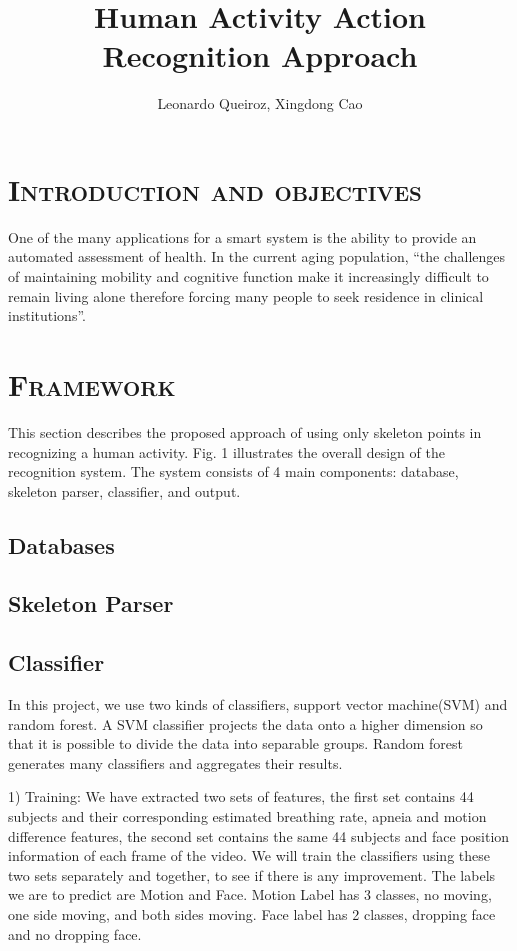 \documentclass{article}
\begin{document}
	\title{Human Activity Action Recognition Approach}
	\author{Leonardo Queiroz, Xingdong Cao}
	\date{}
	\maketitle
	
	\section{\textsc{Introduction and objectives}}
		One of the many applications for a smart system is the ability to provide an automated assessment of health. In the current aging population, “the challenges of maintaining mobility and cognitive function make it increasingly difficult to remain living alone therefore forcing many people to seek residence in clinical institutions”.
		
	\section{\textsc{Framework}}
		This section describes the proposed approach of using only skeleton points in recognizing a human activity. Fig. 1 illustrates the overall design of the recognition system. The system consists of 4 main components: database, skeleton parser, classifier, and output.
		\subsection{Databases}
		\subsection{Skeleton Parser}
		\subsection{Classifier}
		In this project, we use two kinds of classifiers, support vector machine(SVM) and random forest. A SVM classifier projects the data onto a higher dimension so that it is possible to divide the data into separable groups\cite{cortes1995support}. Random forest generates many classifiers and aggregates their results\cite{liaw2002classification}.
		
		1) Training: We have extracted two sets of features, the first set contains 44 subjects and their corresponding estimated breathing rate, apneia and motion difference features, the second set contains the same 44 subjects and face position information of each frame of the video. We will train the classifiers using these two sets separately and together, to see if there is any improvement. The labels we are to predict are Motion and Face. Motion Label has 3 classes, no moving, one side moving, and both sides moving. Face label has 2 classes, dropping face and no dropping face.
		
\end{document}
